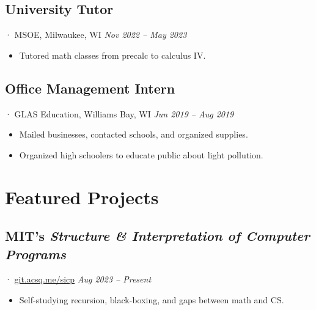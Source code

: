 \documentclass[12pt]{article}
\newcommand{\itemspace}{\vspace{0.3170em}}
\begin{document}
\itemspace

\subsection{University Tutor}
· MSOE, Milwaukee, WI \hfill \textit{Nov 2022 -- May 2023}

\begin{itemize}[noitemsep,nolistsep]
  \item Tutored math classes from precalc to calculus IV.
\end{itemize}

\itemspace

\subsection{Office Management Intern}
· GLAS Education, Williams Bay, WI  \hfill \textit{Jun 2019 -- Aug 2019}

\begin{itemize}[noitemsep,nolistsep]
  \item Mailed businesses, contacted schools, and organized supplies.

  \item Organized high schoolers to educate public about light pollution.
\end{itemize}

\itemspace

\section{Featured Projects}

\subsection{MIT's \textit{Structure \& Interpretation of Computer Programs}} ·
\href{https://git.acsq.me/sicp/about/}{git.acsq.me/sicp}
\hfill \textit{Aug 2023 -- Present}

\begin{itemize}[noitemsep,nolistsep]
  \item Self-studying recursion, black-boxing, and gaps between math and CS.
\end{itemize}
\end{document}
